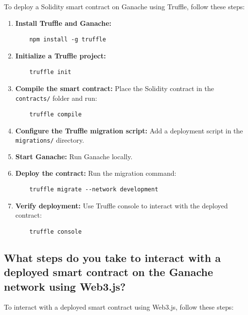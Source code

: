 \documentclass[11pt]{article}
\begin{document}
To deploy a Solidity smart contract on Ganache using Truffle, follow these steps:

\begin{enumerate}
    \item \textbf{Install Truffle and Ganache:} 
    \begin{verbatim}
    npm install -g truffle
    \end{verbatim}
    \item \textbf{Initialize a Truffle project:} 
    \begin{verbatim}
    truffle init
    \end{verbatim}
    \item \textbf{Compile the smart contract:} Place the Solidity contract in the \texttt{contracts/} folder and run:
    \begin{verbatim}
    truffle compile
    \end{verbatim}
    \item \textbf{Configure the Truffle migration script:} Add a deployment script in the \texttt{migrations/} directory.
    \item \textbf{Start Ganache:} Run Ganache locally.
    \item \textbf{Deploy the contract:} Run the migration command:
    \begin{verbatim}
    truffle migrate --network development
    \end{verbatim}
    \item \textbf{Verify deployment:} Use Truffle console to interact with the deployed contract:
    \begin{verbatim}
    truffle console
    \end{verbatim}
\end{enumerate}

\subsection{What steps do you take to interact with a deployed smart contract on the Ganache network using Web3.js?}

To interact with a deployed smart contract using Web3.js, follow these steps:
\end{document}
